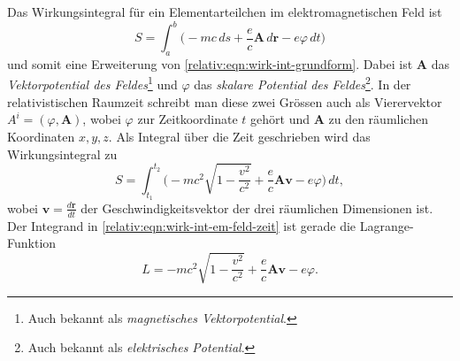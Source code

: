 Das Wirkungsintegral für ein Elementarteilchen im elektromagnetischen Feld ist
\begin{equation}
    S = \int_a^b \biggl(-mc\,ds + \frac{e}{c} \bm{A}\,d\bm{r} - e\varphi\,dt\biggr)
    \label{relativ:eqn:wirk-int-em-feld}
\end{equation}
und somit eine Erweiterung von \eqref{relativ:eqn:wirk-int-grundform}.
Dabei ist \(\bm{A}\) das \emph{Vektorpotential des Feldes}\footnote{
    Auch bekannt als \emph{magnetisches Vektorpotential}.}
und \(\varphi\) das \emph{skalare Potential des Feldes}\footnote{
    Auch bekannt als \emph{elektrisches Potential}.}.
In der relativistischen Raumzeit schreibt man diese zwei Grössen
auch als Vierervektor \(A^i = (\varphi, \bm{A})\),
wobei \(\varphi\) zur Zeitkoordinate \(t\) gehört und
\(\bm{A}\) zu den räumlichen Koordinaten \(x, y, z\).
Als Integral über die Zeit geschrieben wird das Wirkungsintegral zu
\begin{equation}
    S = \int_{t_1}^{t_2} \biggl( -mc^2 \sqrt{1-\frac{v^2}{c^2}} + \frac{e}{c} \bm{A} \bm{v} - e \varphi \biggr) \, dt,
    \label{relativ:eqn:wirk-int-em-feld-zeit}
\end{equation}
wobei \(\displaystyle \bm{v} = \frac{d\bm{r}}{dt}\) der Geschwindigkeitsvektor der drei räumlichen Dimensionen ist.
Der Integrand in \eqref{relativ:eqn:wirk-int-em-feld-zeit} ist gerade die Lagrange-Funktion
\begin{equation}
    L = -mc^2 \sqrt{1-\frac{v^2}{c^2}} + \frac{e}{c} \bm{A} \bm{v} - e \varphi.
    \label{relativ:eqn:lagrange-em-feld}
\end{equation}

